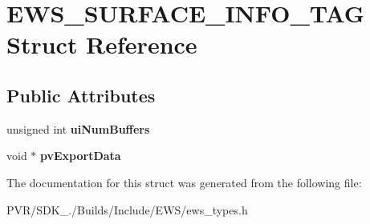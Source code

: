\hypertarget{struct_e_w_s___s_u_r_f_a_c_e___i_n_f_o___t_a_g}{\section{E\+W\+S\+\_\+\+S\+U\+R\+F\+A\+C\+E\+\_\+\+I\+N\+F\+O\+\_\+\+T\+A\+G Struct Reference}
\label{struct_e_w_s___s_u_r_f_a_c_e___i_n_f_o___t_a_g}
}
\subsection*{Public Attributes}
\begin{DoxyCompactItemize}
\item 
\hypertarget{struct_e_w_s___s_u_r_f_a_c_e___i_n_f_o___t_a_g_a09252e10d1ee2ce7017d72965f0c8ed7}{unsigned int {\bfseries ui\+Num\+Buffers}}\label{struct_e_w_s___s_u_r_f_a_c_e___i_n_f_o___t_a_g_a09252e10d1ee2ce7017d72965f0c8ed7}

\item 
\hypertarget{struct_e_w_s___s_u_r_f_a_c_e___i_n_f_o___t_a_g_a2ebf6a65f192cbcfa31e7056939a3d0b}{void $\ast$ {\bfseries pv\+Export\+Data}}\label{struct_e_w_s___s_u_r_f_a_c_e___i_n_f_o___t_a_g_a2ebf6a65f192cbcfa31e7056939a3d0b}

\end{DoxyCompactItemize}


The documentation for this struct was generated from the following file\+:\begin{DoxyCompactItemize}
\item 
P\+V\+R/\+S\+D\+K\+\_./\+Builds/\+Include/\+E\+W\+S/ews\+\_\+types.\+h\end{DoxyCompactItemize}
